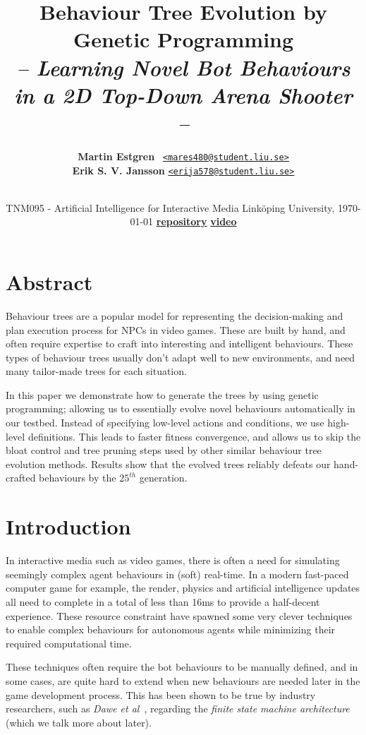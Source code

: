 \documentclass[a4paper, twocolumn]{article}
\title{\textbf{Behaviour Tree Evolution by Genetic Programming}\\
       \Large{\emph{-- Learning Novel Bot Behaviours in a 2D Top-Down Arena Shooter --}}}
\date{
TNM095 - Artificial Intelligence for Interactive Media\endgraf\bigskip
Linköping University, \today\endgraf\bigskip
\href{https://github.com/sci10n/Quake2D}{\textbf{repository}} \href{https://vimeo.com/242262802}{\textbf{video}}
}
\author{{\textbf{Martin Estgren}} \;\;\;\;\;\;\;\;\;\, {\href{mailto:mares480@student.liu.se}
                                                       {\texttt{<mares480@student.liu.se>}}} \\
        {\textbf{Erik S. V. Jansson}} \;\;\;\;         {\href{mailto:erija578@student.liu.se}
                                                       {\texttt{<erija578@student.liu.se>}}} \\~\\
        \vspace{-5.0ex}}
\begin{document}
    \maketitle
    

    \section*{Abstract}

    Behaviour trees are a popular model for representing the decision-making and plan execution process for NPCs in video games. These are built by hand, and often require expertise to craft into interesting and intelligent behaviours. These types of behaviour trees usually don't adapt well to new environments, and need many tailor-made trees for each situation.

    In this paper we demonstrate how to generate the trees by using genetic programming; allowing us to essentially evolve novel behaviours automatically in our testbed. Instead of specifying low-level actions and conditions, we use high-level definitions. This leads to faster fitness convergence, and allows us to skip the bloat control and tree pruning steps used by other similar behaviour tree evolution methods. Results show that the evolved trees reliably defeats our hand-crafted behaviours by the \(25^{th}\) generation.

    \vspace{1em}

    \begingroup
    \def\addvspace#1{}
    \tableofcontents
    \endgroup

    \section{Introduction} \label{sec:introduction}

    In interactive media such as video games, there is often a need for simulating seemingly complex agent behaviours in (soft) real-time. In a modern fast-paced computer game for example, the render, physics and artificial intelligence updates all need to complete in a total of less than 16ms to provide a half-decent experience. These resource constraint have spawned some very clever techniques to enable complex behaviours for autonomous agents while minimizing their required computational time.

    These techniques often require the bot behaviours to be manually defined, and in some cases, are quite hard to extend when new behaviours are needed later in the game development process. This has been shown to be true by industry researchers, such as \emph{Dawe et al}~\cite{dawe2014overview}, regarding the \emph{finite state machine architecture} (which we talk more about later).
\end{document}
